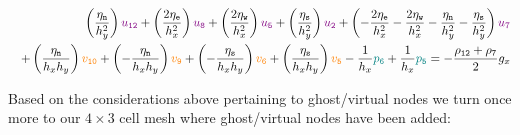 \begin{eqnarray}
&&
\left( \frac{\eta_{\tt n}}{h_y^2} \right) {\color{violet} u_{\tt 12}} + 
\left( \frac{2\eta_{\tt e}}{h_x^2} \right) {\color{violet} u_{\tt 8}} + 
\left( \frac{2\eta_{\tt w}}{h_x^2} \right) {\color{violet} u_{\tt 5}} + 
\left( \frac{\eta_{\tt s}}{h_y^2} \right) {\color{violet} u_{\tt 2}} + 
\left( -\frac{2\eta_{\tt e}}{h_x^2} -\frac{2\eta_{\tt w}}{h_x^2}  
-\frac{\eta_{\tt n}}{h_y^2} -\frac{\eta_{\tt s}}{h_y^2}  
\right) {\color{violet} u_7} \nonumber\\
&&+
\left( \frac{\eta_{\tt n}}{h_x h_y} \right) {\color{orange} v_{\tt 10}}+ 
\left(-\frac{\eta_{\tt n}}{h_x h_y} \right) {\color{orange} v_{\tt 9}}+ 
\left(-\frac{\eta_{\tt s}}{h_x h_y} \right) {\color{orange} v_{\tt 6}}+ 
\left( \frac{\eta_{\tt s}}{h_x h_y} \right) {\color{orange} v_{\tt 5}} 
- \frac{1}{h_x} {\color{teal}p_{\tt 6}} + \frac{1}{h_x} {\color{teal}p_{\tt 5}} = -\frac{\rho_{\tt 12}+\rho_{\tt 7}}{2} g_x 
\nonumber
\end{eqnarray}

Based on the considerations above pertaining to ghost/virtual nodes
we turn once more to our $4\times 3$ cell mesh where ghost/virtual nodes have been added:



